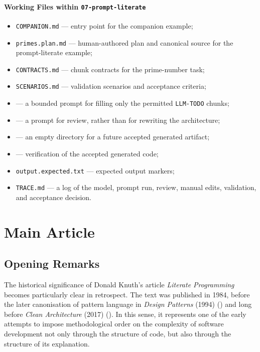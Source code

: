 \documentclass{ZGJournalArticle_2026}
\providecommand{\tightlist}{%
  \setlength{\itemsep}{0pt}\setlength{\parskip}{0pt}}
\begin{document}
\paragraph{\texorpdfstring{Working Files within
\texttt{07-prompt-literate}}{Working Files within 07-prompt-literate}}\label{working-files-within-07-prompt-literate}

\begin{itemize}
\tightlist
\item
  \texttt{COMPANION.md} --- entry point for the companion example;
\item
  \texttt{primes.plan.md} --- human-authored plan and canonical source
  for the prompt-literate example;
\item
  \texttt{CONTRACTS.md} --- chunk contracts for the prime-number task;
\item
  \texttt{SCENARIOS.md} --- validation scenarios and acceptance
  criteria;
\item
  {} --- a bounded
  prompt for filling only the permitted \texttt{LLM-TODO} chunks;
\item
  {} --- a
  prompt for review, rather than for rewriting the architecture;
\item
  {} --- an empty directory for a
  future accepted generated artifact;
\item
  {} --- verification of the
  accepted generated code;
\item
  \texttt{output.expected.txt} --- expected output markers;
\item
  \texttt{TRACE.md} --- a log of the model, prompt run, review, manual
  edits, validation, and acceptance decision.
\end{itemize}

\section{Main Article}\label{main-article-1}

\subsection{Opening Remarks}\label{opening-remarks}

The historical significance of Donald Knuth's article \emph{Literate
Programming} becomes particularly clear in retrospect. The text was
published in 1984, before the later canonisation of pattern language in
\emph{Design Patterns} (1994)
() and long
before \emph{Clean Architecture} (2017)
(). In this
sense, it represents one of the early attempts to impose methodological
order on the complexity of software development not only through the
structure of code, but also through the structure of its explanation.
\end{document}
